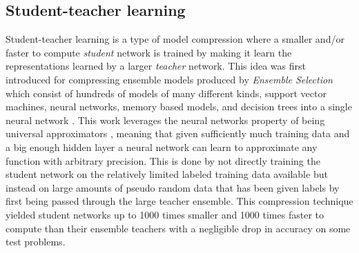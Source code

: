 \documentclass{kththesis}
\newcommand{\bibentry}[1]{\parencite{#1}}
\begin{document}
\subsection{Student-teacher learning}
Student-teacher learning is a type of model compression where a smaller and/or
faster to compute \emph{student} network is trained by making it learn the
representations learned by a larger \emph{teacher} network. This idea was first
introduced for compressing ensemble models produced by \emph{Ensemble Selection}
\bibentry{caruana2004ensemble} which consist of hundreds of models of many
different kinds, support vector machines, neural networks, memory based models,
and decision trees into a single neural network \bibentry{bucilua2006model}.
This work leverages the neural networks property of being universal
approximators \bibentry{cybenko1989approximation}, meaning that given
sufficiently much training data and a big enough hidden layer a neural network
can learn to approximate any function with arbitrary precision. This is done by not directly
training the student network on the relatively limited labeled training data
available but instead on large amounts of pseudo random data that has been given
labels by first being passed through the large teacher ensemble. This
compression technique yielded student networks up to 1000 times smaller and 1000
times faster to compute than their ensemble teachers with a negligible drop in accuracy
on some test problems. 
\end{document}
